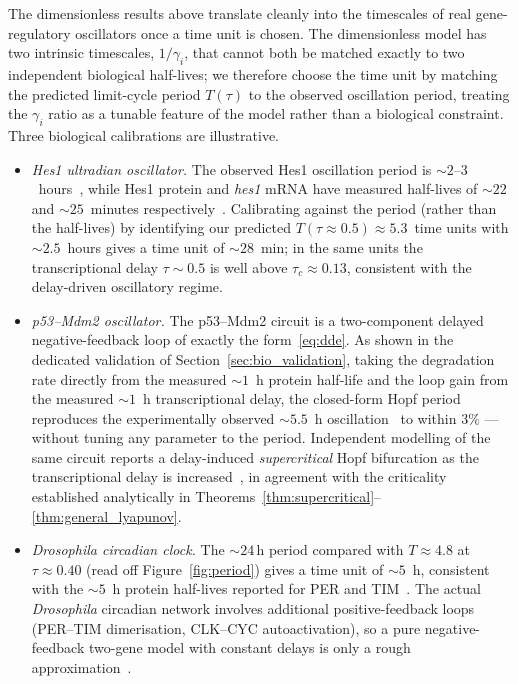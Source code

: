\documentclass[sn-mathphys,Numbered]{sn-jnl}
\theoremstyle{thmstyleone}
\theoremstyle{thmstyletwo}
\theoremstyle{thmstylethree}
\begin{document}
The dimensionless results above translate cleanly into the timescales
of real gene-regulatory oscillators once a time unit is chosen. The
dimensionless model has two intrinsic timescales, $1/\gamma_i$, that
cannot both be matched exactly to two independent biological half-lives;
we therefore choose the time unit by matching the predicted limit-cycle
period $T(\tau)$ to the observed oscillation period, treating the
$\gamma_i$ ratio as a tunable feature of the model rather than a
biological constraint. Three biological calibrations are illustrative.
\begin{itemize}
  \item \emph{Hes1 ultradian oscillator.} The observed Hes1 oscillation
        period is $\sim 2$--$3$~hours~\cite{hirata2002oscillatory}, while
        Hes1 protein and \emph{hes1} mRNA have measured half-lives of
        $\sim 22$ and $\sim 25$~minutes
        respectively~\cite{hirata2002oscillatory,monk2003oscillatory}.
        Calibrating against the period (rather than the half-lives) by
        identifying our predicted $T(\tau\!\approx\!0.5)\approx 5.3$~time
        units with $\sim 2.5$~hours gives a time unit of $\sim 28$~min;
        in the same units the transcriptional delay $\tau\sim 0.5$ is
        well above $\tau_c\approx 0.13$, consistent with the
        delay-driven oscillatory regime.
  \item \emph{p53--Mdm2 oscillator.} The p53--Mdm2 circuit is a
        two-component delayed negative-feedback loop of exactly the
        form~\eqref{eq:dde}. As shown in the dedicated validation of
        Section~\ref{sec:bio_validation}, taking the degradation rate
        directly from the measured $\sim1$~h protein half-life and the
        loop gain from the measured $\sim1$~h transcriptional delay, the
        closed-form Hopf period reproduces the experimentally observed
        $\sim5.5$~h oscillation~\cite{gevazatorsky2006oscillations} to
        within $3\%$ --- without tuning any parameter to the period.
        Independent modelling of the same circuit reports a
        delay-induced \emph{supercritical} Hopf bifurcation as the
        transcriptional delay is increased~\cite{levbaror2000generation},
        in agreement with the criticality established analytically in
        Theorems~\ref{thm:supercritical}--\ref{thm:general_lyapunov}.
  \item \emph{Drosophila circadian clock.} The $\sim 24$\,h period
        compared with $T\approx 4.8$ at $\tau\approx 0.40$ (read off
        Figure~\ref{fig:period}) gives a time unit of $\sim 5$~h,
        consistent with the $\sim 5$~h protein half-lives reported for
        PER and TIM~\cite{hardin1990feedback}. The actual
        \emph{Drosophila} circadian network involves additional
        positive-feedback loops (PER--TIM dimerisation, CLK--CYC
        autoactivation), so a pure negative-feedback two-gene model
        with constant delays is only a rough
        approximation~\cite{smolen2002reduced}.
\end{itemize}
\end{document}
